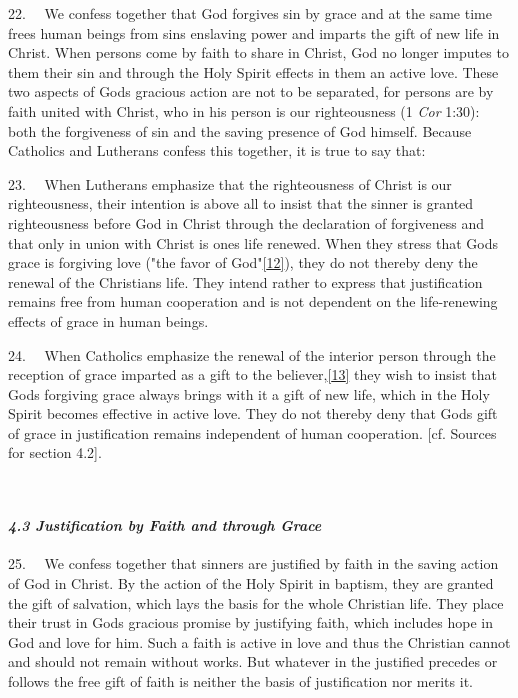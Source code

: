 22.~ ~We confess together that God forgives sin by grace and at the same
time frees human beings from sin\textquotesingle s enslaving power and
imparts the gift of new life in Christ. When persons come by faith to
share in Christ, God no longer imputes to them their sin and through the
Holy Spirit effects in them an active love. These two aspects of
God\textquotesingle s gracious action are not to be separated, for
persons are by faith united with Christ, who in his person is our
righteousness (1 \emph{Cor} 1:30): both the forgiveness of sin and the
saving presence of God himself. Because Catholics and Lutherans confess
this together, it is true to say that:

23.~ ~When Lutherans emphasize that the righteousness of Christ is our
righteousness, their intention is above all to insist that the sinner is
granted righteousness before God in Christ through the declaration of
forgiveness and that only in union with Christ is one\textquotesingle s
life renewed. When they stress that God\textquotesingle s grace is
forgiving love ("the favor of
God"\label{r12}{}\hyperref[12]{{[}12{]}}), they do not
thereby deny the renewal of the Christian\textquotesingle s life. They
intend rather to express that justification remains free from human
cooperation and is not dependent on the life-renewing effects of grace
in human beings.

24.~ ~When Catholics emphasize the renewal of the interior person
through the reception of grace imparted as a gift to the
believer,\label{r13}{}\hyperref[13]{{[}13{]}} they wish
to insist that God\textquotesingle s forgiving grace always brings with
it a gift of new life, which in the Holy Spirit becomes effective in
active love. They do not thereby deny that God\textquotesingle s gift of
grace in justification remains independent of human cooperation. {[}cf.
Sources for section 4.2{]}.

~

\paragraph{\texorpdfstring{\emph{4.3 Justification by Faith and through
Grace}}{4.3 Justification by Faith and through Grace}}\label{justification-by-faith-and-through-grace}

25.~ ~We confess together that sinners are justified by faith in the
saving action of God in Christ. By the action of the Holy Spirit in
baptism, they are granted the gift of salvation, which lays the basis
for the whole Christian life. They place their trust in
God\textquotesingle s gracious promise by justifying faith, which
includes hope in God and love for him. Such a faith is active in love
and thus the Christian cannot and should not remain without works. But
whatever in the justified precedes or follows the free gift of faith is
neither the basis of justification nor merits it.

